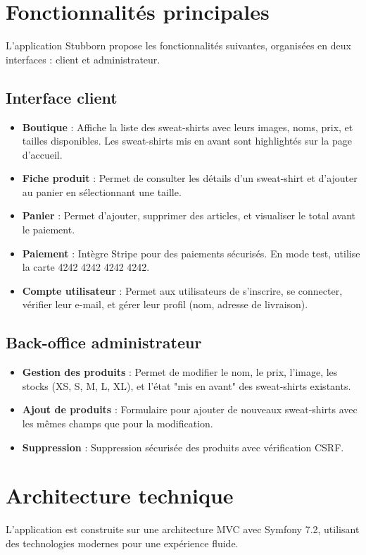 \documentclass[a4paper,11pt]{article}
\begin{document}
\section{Fonctionnalités principales}
L'application Stubborn propose les fonctionnalités suivantes, organisées en deux interfaces : client et administrateur.

\subsection{Interface client}
\begin{itemize}
    \item \textbf{Boutique} : Affiche la liste des sweat-shirts avec leurs images, noms, prix, et tailles disponibles. Les sweat-shirts mis en avant sont highlightés sur la page d'accueil.
    \item \textbf{Fiche produit} : Permet de consulter les détails d'un sweat-shirt et d'ajouter au panier en sélectionnant une taille.
    \item \textbf{Panier} : Permet d'ajouter, supprimer des articles, et visualiser le total avant le paiement.
    \item \textbf{Paiement} : Intègre Stripe pour des paiements sécurisés. En mode test, utilise la carte 4242 4242 4242 4242.
    \item \textbf{Compte utilisateur} : Permet aux utilisateurs de s'inscrire, se connecter, vérifier leur e-mail, et gérer leur profil (nom, adresse de livraison).
\end{itemize}

\subsection{Back-office administrateur}
\begin{itemize}
    \item \textbf{Gestion des produits} : Permet de modifier le nom, le prix, l'image, les stocks (XS, S, M, L, XL), et l'état "mis en avant" des sweat-shirts existants.
    \item \textbf{Ajout de produits} : Formulaire pour ajouter de nouveaux sweat-shirts avec les mêmes champs que pour la modification.
    \item \textbf{Suppression} : Suppression sécurisée des produits avec vérification CSRF.
\end{itemize}

\section{Architecture technique}
L'application est construite sur une architecture MVC avec Symfony 7.2, utilisant des technologies modernes pour une expérience fluide.
\end{document}
